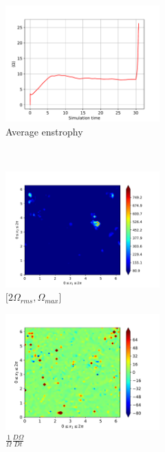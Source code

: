 \begin{figure}[H]
    \begin{subfigure}[H]{0.45\textwidth}
        \includegraphics[height=1.75in]{media/run-cds-65/enst-average1400}
        \caption{Average enstrophy}
    \end{subfigure}
    ~
    \begin{subfigure}[H]{0.45\textwidth}
        \includegraphics[height=1.75in]{media/run-cds-65/enst-2-1400}
        \caption{$[2\Omega_{rms}, \Omega_{max} $] }
    \end{subfigure}
    \newline
    \begin{subfigure}[H]{0.45\textwidth}
        \includegraphics[height=1.75in]{media/run-cds-65/enst-1400}
        \caption{$\frac{1}{\Omega} \frac{D \Omega}{Dt}$}
    \end{subfigure}
    ~
    \begin{subfigure}{0.45\textwidth}

\end{subfigure}
\end{figure}
